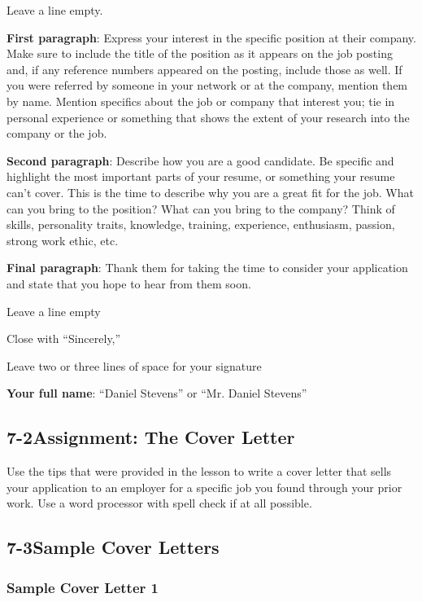 Leave a line empty.

\textbf{First paragraph}: Express your interest in the specific position at their company. Make sure to include the title of the position as it appears on the job posting and, if any reference numbers appeared on the posting, include those as well. If you were referred by someone in your network or at the company, mention them by name. Mention specifics about the job or company that interest you; tie in personal experience or something that shows the extent of your research into the company or the job.

\textbf{Second paragraph}: Describe how you are a good candidate. Be specific and highlight the most important parts of your resume, or something your resume can't cover. This is the time to describe why you are a great fit for the job. What can you bring to the position? What can you bring to the company? Think of skills, personality traits, knowledge, training, experience, enthusiasm, passion, strong work ethic, etc.

\textbf{Final paragraph}: Thank them for taking the time to consider your application and state that you hope to hear from them soon.

Leave a line empty 

Close with ``Sincerely,''

Leave two or three lines of space for your signature

\textbf{Your full name}: ``Daniel Stevens'' or ``Mr. Daniel Stevens''

\pagebreak \subsection*{7-2\quad Assignment: The Cover Letter}
Use the tips that were provided in the lesson to write a cover letter that sells your application to an employer for a specific job you found through your prior work. Use a word processor with spell check if at all possible.
 
\pagebreak \subsection*{7-3\quad Sample Cover Letters}
\subsubsection*{Sample Cover Letter 1}


